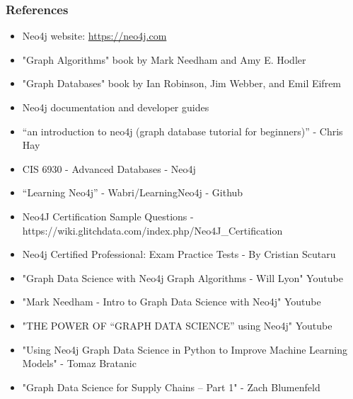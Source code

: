 
\begin{frame}\frametitle{References}
\begin{itemize}
\item Neo4j website: \url{https://neo4j.com}
\item "Graph Algorithms" book by Mark Needham and Amy E. Hodler
\item "Graph Databases" book by Ian Robinson, Jim Webber, and Emil Eifrem
\item Neo4j documentation and developer guides
\item ``an introduction to neo4j (graph database tutorial for beginners)'' - Chris Hay
\item CIS 6930 - Advanced Databases - Neo4j 
\item ``Learning Neo4j'' - Wabri/LearningNeo4j - Github
\item Neo4J Certification Sample Questions - https://wiki.glitchdata.com/index.php/Neo4J\_Certification
\item Neo4j Certified Professional: Exam Practice Tests - By Cristian Scutaru
\item "Graph Data Science with Neo4j Graph Algorithms - Will Lyon" Youtube
\item "Mark Needham - Intro to Graph Data Science with Neo4j" Youtube
\item "THE POWER OF “GRAPH DATA SCIENCE” using Neo4j" Youtube
\item "Using Neo4j Graph Data Science in Python to Improve Machine Learning Models" - Tomaz Bratanic 
\item "Graph Data Science for Supply Chains – Part 1" - Zach Blumenfeld
\end{itemize}
\end{frame}